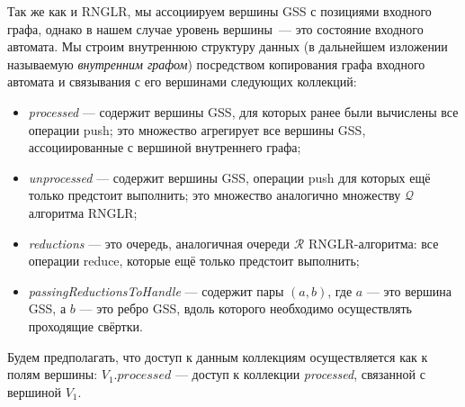 Так же как и RNGLR, мы ассоциируем вершины GSS с позициями входного графа, однако в нашем случае уровень вершины~--- это состояние входного автомата. Мы строим внутреннюю структуру данных (в дальнейшем изложении называемую \emph{внутренним графом}) посредством копирования графа входного автомата и связывания с его вершинами следующих коллекций:
\begin{itemize}
  \item \emph{processed} --- содержит вершины GSS, для которых ранее были вычислены все операции push; это множество агрегирует все вершины GSS, ассоциированные с вершиной внутреннего графа;
  \item \emph{unprocessed} --- содержит вершины GSS, операции push для которых ещё только предстоит выполнить; это множество аналогично множеству $\mathcal{Q}$ алгоритма RNGLR;
  \item \emph{reductions} --- это очередь, аналогичная очереди $\mathcal{R}$ RNGLR-алгоритма: все операции reduce, которые ещё только предстоит выполнить;
  \item \emph{passingReductionsToHandle} --- содержит пары $(a,b)$, где $a$ --- это вершина GSS, а $b$ --- это ребро GSS, вдоль которого необходимо осуществлять проходящие свёртки.
\end{itemize}

Будем предполагать, что доступ к данным коллекциям осуществляется как к полям вершины: $V_1.processed$ --- доступ к коллекции \emph{processed}, связанной с вершиной $V_1$.

